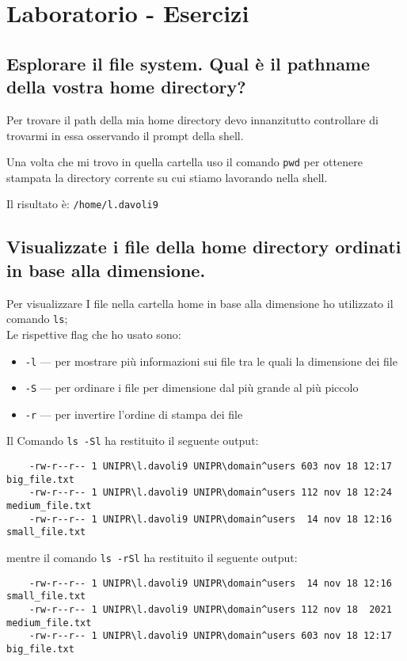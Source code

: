 \documentclass{article}
\begin{document}
\section{Laboratorio - Esercizi}

\subsection{Esplorare il file system. Qual è il pathname della vostra home directory?}
Per trovare il path della mia home directory devo innanzitutto controllare di trovarmi in essa osservando il prompt della shell.

Una volta che mi trovo in quella cartella uso il comando \texttt{pwd} 
per ottenere stampata la directory corrente su cui stiamo lavorando nella shell.

Il risultato è: \texttt{/home/l.davoli9}

\subsection{Visualizzate i file della home directory ordinati in base alla dimensione.}
Per visualizzare I file nella cartella home in base alla dimensione ho utilizzato il comando \texttt{ls};\\
Le rispettive flag che ho usato sono:
\begin{itemize}
    \item \texttt{-l} --- per mostrare più informazioni sui file tra le quali la dimensione dei file
    \item \texttt{-S} --- per ordinare i file per dimensione dal più grande al più piccolo
    \item \texttt{-r} --- per invertire l'ordine di stampa dei file
\end{itemize}

Il Comando \texttt{ls -Sl} ha restituito il seguente output:
\begin{verbatim}
    -rw-r--r-- 1 UNIPR\l.davoli9 UNIPR\domain^users 603 nov 18 12:17 big_file.txt
    -rw-r--r-- 1 UNIPR\l.davoli9 UNIPR\domain^users 112 nov 18 12:24 medium_file.txt
    -rw-r--r-- 1 UNIPR\l.davoli9 UNIPR\domain^users  14 nov 18 12:16 small_file.txt
\end{verbatim}
mentre il comando \texttt{ls -rSl} ha restituito il seguente output:
\begin{verbatim}
    -rw-r--r-- 1 UNIPR\l.davoli9 UNIPR\domain^users  14 nov 18 12:16 small_file.txt
    -rw-r--r-- 1 UNIPR\l.davoli9 UNIPR\domain^users 112 nov 18  2021 medium_file.txt
    -rw-r--r-- 1 UNIPR\l.davoli9 UNIPR\domain^users 603 nov 18 12:17 big_file.txt
\end{verbatim}
\end{document}
